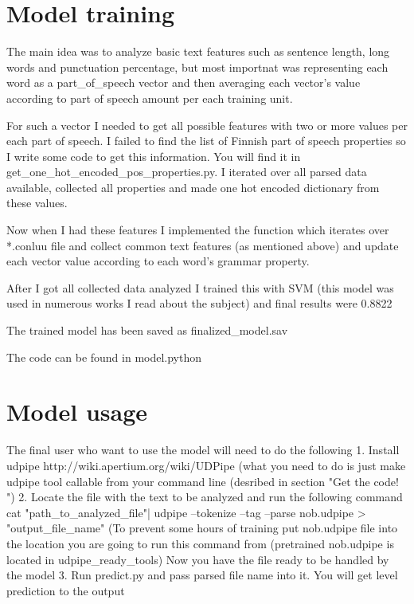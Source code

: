 \documentclass{article}
\begin{document}
 \section{Model training}
The main idea was to analyze basic text features such as sentence length, long words and punctuation percentage, but most importnat was representing each word as a part_of_speech vector and then averaging each vector's value according to part of speech amount per each training unit.

For such a vector I needed to get all possible features with two or more values per each part of speech. I failed to find the list of Finnish part of speech properties so I write some code to get this information. You will find it in get_one_hot_encoded_pos_properties.py. I iterated over all parsed data available, collected all properties and made one hot encoded dictionary from these values. 
 
 
 Now when I had these features I implemented the function which iterates over *.conluu file and collect common text features (as mentioned above) and update each vector value according to each word's grammar property. 
 
 After I got all collected data analyzed I trained this with SVM (this model was used in numerous works I read about the subject) and final results were  0.8822
 
 The trained model has been saved as finalized_model.sav
 
 The code can be found in model.python
 
  \section{Model usage}
  
  The final user who want to use the model will need to do the following
  1. Install udpipe http://wiki.apertium.org/wiki/UDPipe (what you need to do is just make udpipe tool callable from your command line (desribed in section "Get the code! ")
  2. Locate the file with the text to be analyzed and run the following command 
  cat "path_to_analyzed_file"| udpipe --tokenize --tag --parse nob.udpipe > "output_file_name"
  (To prevent some hours of training put nob.udpipe file into the location you are going to run this command from (pretrained nob.udpipe is located in udpipe_ready_tools)
  Now you have the file ready to be handled by the model
  3. Run predict.py and pass parsed file name into it. You will get level prediction to the output
  
  
\end{document}
